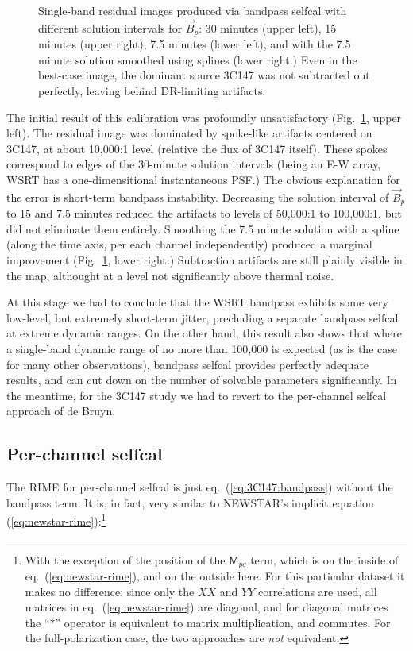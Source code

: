 \documentclass[]{aa}
\newcommand{\jones}[2]{\vec {#1}_{#2}}
\newcommand{\coh}[2]{\mathsf{{#1}}_{{#2}}}
\begin{document}
\begin{figure}
\begin{centering}
\end{centering}
\caption{\label{fig:Bsol}Single-band residual images produced via bandpass selfcal with different solution intervals for $\jones{B}{p}$: 30 minutes (upper left), 15 minutes (upper right), 7.5 minutes (lower left), and with the 7.5 minute solution smoothed using splines (lower right.) Even in the best-case image, the dominant source 3C147 was not subtracted out perfectly, leaving behind DR-limiting artifacts.}
\end{figure}

The initial result of this calibration was profoundly unsatisfactory (Fig.~\ref{fig:Bsol}, upper left). The residual image was dominated by spoke-like artifacts centered on 3C147, at about 10,000:1 level (relative the flux of 3C147 itself). These spokes correspond to edges of the 30-minute solution intervals (being an E-W array, WSRT has a one-dimensitional instantaneous PSF.) The obvious explanation for the error is short-term bandpass instability. Decreasing the solution interval of $\jones{B}{p}$ to 15 and 7.5 minutes reduced the artifacts to levels of 50,000:1 to 100,000:1, but did not eliminate them entirely. Smoothing the 7.5 minute solution with a spline (along the time axis, per each channel independently) produced a marginal improvement (Fig.~\ref{fig:Bsol}, lower right.) Subtraction artifacts are still plainly visible in the map, althought at a level not significantly above thermal noise.

At this stage we had to conclude that the WSRT bandpass exhibits some very low-level, but extremely short-term jitter, precluding a separate bandpass selfcal at extreme dynamic ranges. On the other hand, this result also shows that where a single-band dynamic range of no more than 100,000 is expected (as is the case for many other observations), bandpass selfcal provides perfectly adequate results, and can cut down on the number of solvable parameters significantly. In the meantime, for the 3C147 study we had to revert to the per-channel selfcal approach of de Bruyn.

\subsection{Per-channel selfcal}

The RIME for per-channel selfcal is just eq.~(\ref{eq:3C147:bandpass}) without the bandpass term. It is, in fact, very similar to NEWSTAR's implicit equation (\ref{eq:newstar-rime}):\footnote{With the exception of the position of the $\coh{M}{pq}$ term, which is on the inside of eq.~(\ref{eq:newstar-rime}), and on the outside here. For this particular dataset it makes no difference: since only the $XX$ and $YY$ correlations are used, all matrices in eq.~(\ref{eq:newstar-rime}) are diagonal, and for diagonal matrices the ``$\ast$'' operator is equivalent to matrix multiplication, and commutes. For the full-polarization case, the two approaches are \emph{not} equivalent.}
 
\end{document}
